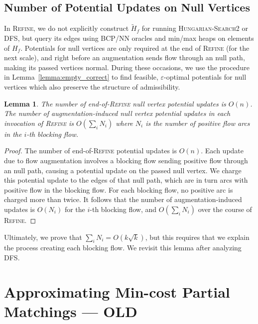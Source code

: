 \documentclass[11pt]{article}
\def\eps{\varepsilon}
\theoremstyle{plain}
\newtheorem{lemma}{Lemma}[section]
\numberwithin{figure}{section}
\begin{document}
\subsection{Number of Potential Updates on Null Vertices}

In \textsc{Refine}, we do not explicitly construct $\tilde{H}_f$ for running
\textsc{Hungarian-Search2} or \textsc{DFS}, but query its edges using BCP/NN
oracles and min/max heaps on elements of $H_f$.
Potentials for null vertices are only required at the end of \textsc{Refine}
(for the next scale), and right before an augmentation sends flow through an
null path, making its passed vertices normal.
During these occasions, we use the procedure in Lemma~\ref{lemma:empty_correct}
to find feasible, $\eps$-optimal potentials for null vertices which
also preserve the structure of admissibility.

\begin{lemma}
\label{lemma:empty_updates}
The number of end-of-\textsc{Refine} null vertex potential updates is $O(n)$.
The number of augmentation-induced null vertex potential updates in each
invocation of \textsc{Refine} is $O(\sum_i N_i)$ where $N_i$ is the number
of positive flow arcs in the $i$-th blocking flow.
\end{lemma}

\begin{proof}
The number of end-of-\textsc{Refine} potential updates is $O(n)$.
Each update due to flow augmentation involves a blocking flow sending positive
flow through an null path, causing a potential update on the passed
null vertex.
We charge this potential update to the edges of that null path, which are in
turn arcs with positive flow in the blocking flow.
For each blocking flow, no positive arc is charged more than twice.
It follows that the number of augmentation-induced updates is $O(N_i)$ for the
$i$-th blocking flow, and $O(\sum_i N_i)$ over the course of \textsc{Refine}.
\end{proof}

Ultimately, we prove that $\sum_i N_i = O(k\sqrt{k})$, but this requires that
we explain the process creating each blocking flow.
We revisit this lemma after analyzing \textsc{DFS}.





\section{Approximating Min-cost Partial Matchings --- OLD}
\label{section:goldberg}
\end{document}

